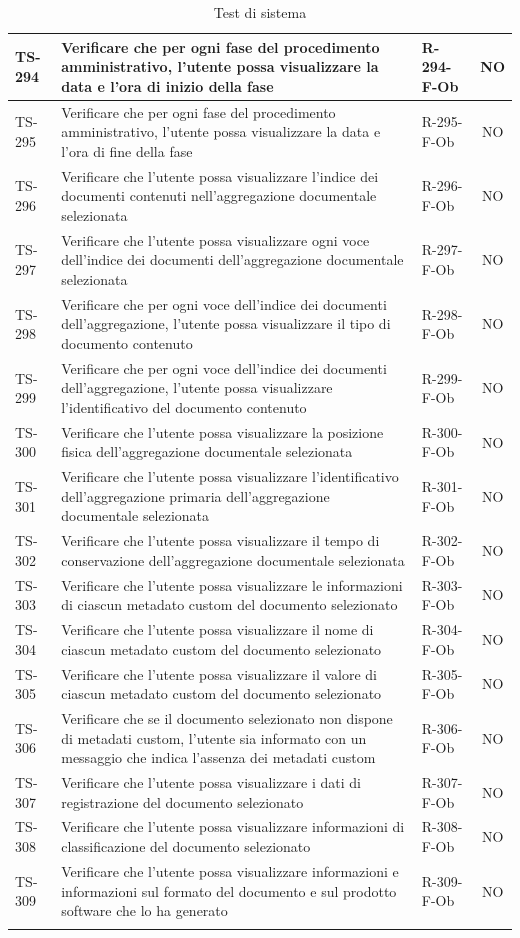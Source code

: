 \documentclass[a4paper,12pt]{article}
\begin{document}
\begin{longtable}{|p{1.5cm}|p{8.3cm}|p{2.4cm}|c|}
TS-294 & Verificare che per ogni fase del procedimento amministrativo, l'utente possa visualizzare la data e l'ora di inizio della fase & R-294-F-Ob & NO \\
\hline
TS-295 & Verificare che per ogni fase del procedimento amministrativo, l'utente possa visualizzare la data e l'ora di fine della fase & R-295-F-Ob & NO \\
\hline
TS-296 & Verificare che l'utente possa visualizzare l'indice dei documenti contenuti nell'aggregazione documentale selezionata & R-296-F-Ob & NO \\
\hline
TS-297 & Verificare che l'utente possa visualizzare ogni voce dell'indice dei documenti dell'aggregazione documentale selezionata & R-297-F-Ob & NO \\
\hline
TS-298 & Verificare che per ogni voce dell'indice dei documenti dell'aggregazione, l'utente possa visualizzare il tipo di documento contenuto & R-298-F-Ob & NO \\
\hline
TS-299 & Verificare che per ogni voce dell'indice dei documenti dell'aggregazione, l'utente possa visualizzare l'identificativo del documento contenuto & R-299-F-Ob & NO \\
\hline
TS-300 & Verificare che l'utente possa visualizzare la posizione fisica dell'aggregazione documentale selezionata & R-300-F-Ob & NO \\
\hline
TS-301 & Verificare che l'utente possa visualizzare l'identificativo dell'aggregazione primaria dell'aggregazione documentale selezionata & R-301-F-Ob & NO \\
\hline
TS-302 & Verificare che l'utente possa visualizzare il tempo di conservazione dell'aggregazione documentale selezionata & R-302-F-Ob & NO \\
\hline
TS-303 & Verificare che l'utente possa visualizzare le informazioni di ciascun metadato custom del documento selezionato & R-303-F-Ob & NO \\
\hline
TS-304 & Verificare che l'utente possa visualizzare il nome di ciascun metadato custom del documento selezionato & R-304-F-Ob & NO \\
\hline
TS-305 & Verificare che l'utente possa visualizzare il valore di ciascun metadato custom del documento selezionato & R-305-F-Ob & NO \\
\hline
TS-306 & Verificare che se il documento selezionato non dispone di metadati custom, l'utente sia informato con un messaggio che indica l'assenza dei metadati custom & R-306-F-Ob & NO \\
\hline
TS-307 & Verificare che l'utente possa visualizzare i dati di registrazione del documento selezionato & R-307-F-Ob & NO \\
\hline
TS-308 & Verificare che l'utente possa visualizzare informazioni di classificazione del documento selezionato & R-308-F-Ob & NO \\
\hline
TS-309 & Verificare che l'utente possa visualizzare informazioni e informazioni sul formato del documento e sul prodotto software che lo ha generato & R-309-F-Ob & NO \\
\hline
\rowcolor{white}
\caption{Test di sistema}
\label{tab:test-sistema}
\end{longtable}
\end{document}
